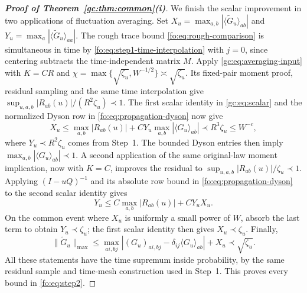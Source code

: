 \documentclass[11pt]{article}
\numberwithin{equation}{section}
\theoremstyle{remark}
\newcommand{\wt}{\widetilde}
\begin{document}
\begin{proof}[\textbf{Proof of Theorem~\ref{gc:thm:common}(i)}]
We finish the scalar improvement in two applications of fluctuation
averaging. Set $X_u=\max_{a,b}|\langle\wt G_u\rangle_{ab}|$ and
$Y_u=\max_a|\langle\wt G_u\rangle_{aa}|$.
The rough trace bound \eqref{fo:eq:rough-comparison} is simultaneous
in time by \eqref{fo:eq:step1-time-interpolation} with $j=0$, since
centering subtracts the time-independent matrix $M$.
Apply \eqref{gc:eq:averaging-input} with $K=CR$ and
$\chi=\max\{\sqrt{\zeta_u},W^{-1/2}\}\asymp\sqrt{\zeta_u}$.
Its fixed-pair moment proof, residual sampling and the same time
interpolation give $\sup_{u,a,b}|R_{ab}(u)|/(R^2\zeta_u)\prec1$.
The first scalar identity in \eqref{gc:eq:scalar} and the normalized
Dyson row in \eqref{fo:eq:propagation-dyson} now give
\[
 X_u\le\max_{a,b}|R_{ab}(u)|
       +CY_u\max_{a,b}|\langle G_u\rangle_{ab}|
 \prec R^3\zeta_u\le W^{-c},
\]
where $Y_u\prec R^2\zeta_u$ comes from Step~1. The bounded Dyson
entries then imply $\max_{a,b}|\langle G_u\rangle_{ab}|\prec1$.
A second application of the same original-law moment implication,
now with $K=C$, improves the residual to
$\sup_{u,a,b}|R_{ab}(u)|/\zeta_u\prec1$.
Applying $(I-uQ)^{-1}$ and its absolute row bound in
\eqref{fo:eq:propagation-dyson} to the second scalar identity gives
\[
 Y_u\le C\max_{a,b}|R_{ab}(u)|+CY_uX_u.
\]
On the common event where $X_u$ is uniformly a small power of $W$,
absorb the last term to obtain $Y_u\prec\zeta_u$; the first scalar
identity then gives $X_u\prec\zeta_u$.
Finally,
\[
 \|\wt G_u\|_{\max}
 \le\max_{ai,bj}|(G_u)_{ai,bj}-\delta_{ij}\langle G_u\rangle_{ab}|+X_u
 \prec\sqrt{\zeta_u}.
\]
All these statements have the time supremum inside probability, by the
same residual sample and time-mesh construction used in Step~1.
This proves every bound in \eqref{fo:eq:step2}.


\end{proof}
\end{document}
